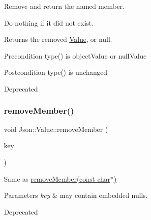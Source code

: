 Remove and return the named member. 

Do nothing if it did not exist. \begin{DoxyReturn}{Returns}
the removed \hyperlink{classJson_1_1Value}{Value}, or null. 
\end{DoxyReturn}
\begin{DoxyPrecond}{Precondition}
type() is object\+Value or null\+Value 
\end{DoxyPrecond}
\begin{DoxyPostcond}{Postcondition}
type() is unchanged 
\end{DoxyPostcond}
\begin{DoxyRefDesc}{Deprecated}
\item[\hyperlink{deprecated__deprecated000001}{Deprecated}]\end{DoxyRefDesc}
\mbox{\label{classJson_1_1Value_a8a660202bbad35857b39e85bd35ec78a}} 
\subsubsection{\texorpdfstring{remove\+Member()}{removeMember()}\hspace{0.1cm}{\footnotesize\ttfamily [2/4]}}
{\footnotesize\ttfamily void Json\+::\+Value\+::remove\+Member (\begin{DoxyParamCaption}\item[{const J\+S\+O\+N\+C\+P\+P\+\_\+\+S\+T\+R\+I\+NG \&}]{key }\end{DoxyParamCaption})}

Same as \hyperlink{classJson_1_1Value_a92e165f04105d27a930fb3a18a053585}{remove\+Member(const char$\ast$)} 
\begin{DoxyParams}{Parameters}
{\em key} & may contain embedded nulls. \\
\hline
\end{DoxyParams}
\begin{DoxyRefDesc}{Deprecated}
\item[\hyperlink{deprecated__deprecated000002}{Deprecated}]\end{DoxyRefDesc}
\mbox{\label{classJson_1_1Value_a708e599489adf30d65bf85a8ee16e6fb}} 
